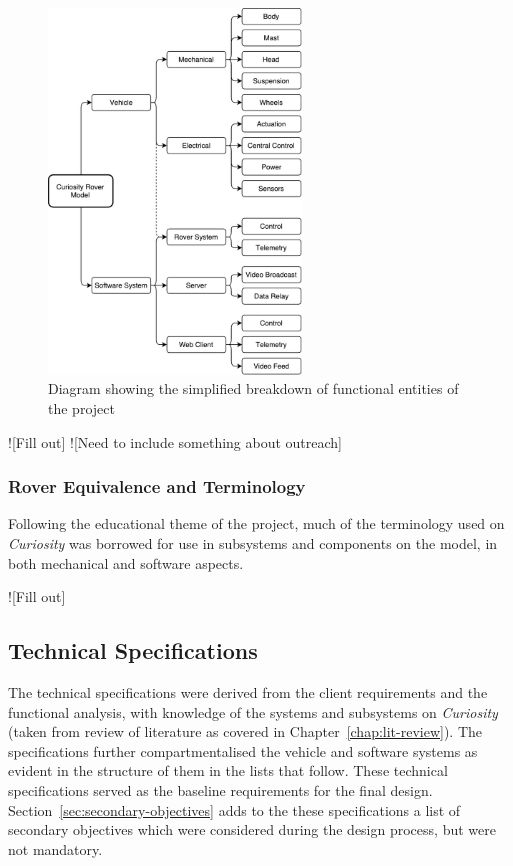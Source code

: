     \begin{figure}[h]
      \centering
      \includegraphics[width=0.6\textwidth]{figures/specs-functionalBreakdown}
      \caption[Diagram showing the simplified breakdown of functional entities of the project]{Diagram showing the simplified breakdown of functional entities of the project}
      \label{fig:specs-functionalBreakdown}
    \end{figure}
    
    ![Fill out]
    ![Need to include something about outreach]
    
    \subsubsection{Rover Equivalence and Terminology}
      Following the educational theme of the project, much of the terminology used on \textit{Curiosity} was borrowed for use in subsystems and components on the model, in both mechanical and software aspects.
      
      ![Fill out]
    
    
  \subsection{Technical Specifications}
    The technical specifications were derived from the client requirements and the functional analysis, with knowledge of the systems and subsystems on \textit{Curiosity} (taken from review of literature as covered in Chapter~\ref{chap:lit-review}). The specifications further compartmentalised the vehicle and software systems as evident in the structure of them in the lists that follow. These technical specifications served as the baseline requirements for the final design. Section~\ref{sec:secondary-objectives} adds to the these specifications a list of secondary objectives which were considered during the design process, but were not mandatory.
    
